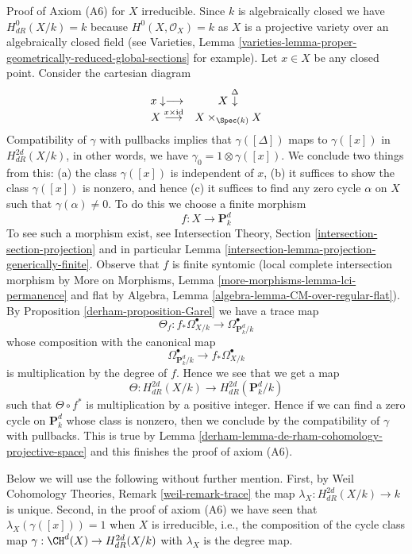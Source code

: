 \medskip\noindent
Proof of Axiom (A6) for $X$ irreducible. Since $k$ is algebraically
closed we have $H^0_{dR}(X/k) = k$ because $H^0(X, \mathcal{O}_X) = k$
as $X$ is a projective variety over an algebraically closed field
(see Varieties, Lemma
\ref{varieties-lemma-proper-geometrically-reduced-global-sections}
for example). Let $x \in X$ be any closed point.
Consider the cartesian diagram
$$
\begin{array}{cc}x \downarrow\longrightarrow & X \overset{\Delta}{\downarrow} \\ X \overset{x \times \text{id}}{\longrightarrow} & X \times_{\Spec(k)} X\end{array}
$$
Compatibility of $\gamma$ with pullbacks implies that
$\gamma([\Delta])$ maps to $\gamma([x])$ in $H_{dR}^{2d}(X/k)$,
in other words, we have $\gamma_0 = 1 \otimes \gamma([x])$.
We conclude two things from this: (a) the class
$\gamma([x])$ is independent of $x$, (b) it suffices
to show the class $\gamma([x])$ is nonzero, and hence (c)
it suffices to find any zero cycle $\alpha$ on $X$ such that
$\gamma(\alpha) \not = 0$. To do this we choose a finite
morphism
$$
f : X \longrightarrow \mathbf{P}^d_k
$$
To see such a morphism exist, see
Intersection Theory, Section \ref{intersection-section-projection}
and in particular Lemma \ref{intersection-lemma-projection-generically-finite}.
Observe that $f$ is finite syntomic (local complete intersection morphism
by More on Morphisms, Lemma \ref{more-morphisms-lemma-lci-permanence}
and flat by Algebra, Lemma \ref{algebra-lemma-CM-over-regular-flat}).
By Proposition \ref{derham-proposition-Garel} we have a trace map
$$
\Theta_f :
f_*\Omega^\bullet_{X/k}
\longrightarrow
\Omega^\bullet_{\mathbf{P}^d_k/k}
$$
whose composition with the canonical map
$$
\Omega^\bullet_{\mathbf{P}^d_k/k}
\longrightarrow
f_*\Omega^\bullet_{X/k}
$$
is multiplication by the degree of $f$. Hence we see that we get a map
$$
\Theta : H_{dR}^{2d}(X/k) \to H_{dR}^{2d}(\mathbf{P}^d_k/k)
$$
such that $\Theta \circ f^*$ is multiplication by a positive integer.
Hence if we can find a zero cycle on $\mathbf{P}^d_k$ whose class
is nonzero, then we conclude by the compatibility of $\gamma$
with pullbacks. This is true by
Lemma \ref{derham-lemma-de-rham-cohomology-projective-space} and this
finishes the proof of axiom (A6).

\medskip\noindent
Below we will use the following without further mention.
First, by Weil Cohomology Theories, Remark \ref{weil-remark-trace}
the map $\lambda_X : H^{2d}_{dR}(X/k) \to k$ is unique.
Second, in the proof of axiom (A6) we have
seen that $\lambda_X(\gamma([x])) = 1$ when $X$ is irreducible, i.e.,
the composition of the cycle class map
$\gamma : \CH^d(X) \to H_{dR}^{2d}(X/k)$ with $\lambda_X$
is the degree map.

